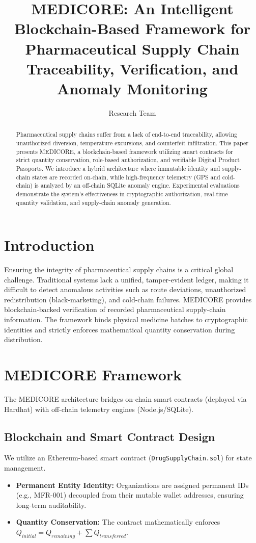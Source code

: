 \documentclass[runningheads]{llncs}
\begin{document}
\title{MEDICORE: An Intelligent Blockchain-Based Framework for Pharmaceutical Supply Chain Traceability, Verification, and Anomaly Monitoring}
\author{Research Team}

\maketitle

\begin{abstract}
Pharmaceutical supply chains suffer from a lack of end-to-end traceability, allowing unauthorized diversion, temperature excursions, and counterfeit infiltration. This paper presents MEDICORE, a blockchain-based framework utilizing smart contracts for strict quantity conservation, role-based authorization, and verifiable Digital Product Passports. We introduce a hybrid architecture where immutable identity and supply-chain states are recorded on-chain, while high-frequency telemetry (GPS and cold-chain) is analyzed by an off-chain SQLite anomaly engine. Experimental evaluations demonstrate the system's effectiveness in cryptographic authorization, real-time quantity validation, and supply-chain anomaly generation.
\end{abstract}

\section{Introduction}
Ensuring the integrity of pharmaceutical supply chains is a critical global challenge. Traditional systems lack a unified, tamper-evident ledger, making it difficult to detect anomalous activities such as route deviations, unauthorized redistribution (black-marketing), and cold-chain failures. MEDICORE provides blockchain-backed verification of recorded pharmaceutical supply-chain information. The framework binds physical medicine batches to cryptographic identities and strictly enforces mathematical quantity conservation during distribution.

\section{MEDICORE Framework}
The MEDICORE architecture bridges on-chain smart contracts (deployed via Hardhat) with off-chain telemetry engines (Node.js/SQLite). 
\subsection{Blockchain and Smart Contract Design}
We utilize an Ethereum-based smart contract (\texttt{DrugSupplyChain.sol}) for state management. 
\begin{itemize}
    \item \textbf{Permanent Entity Identity:} Organizations are assigned permanent IDs (e.g., MFR-001) decoupled from their mutable wallet addresses, ensuring long-term auditability.
    \item \textbf{Quantity Conservation:} The contract mathematically enforces $Q_{initial} = Q_{remaining} + \sum Q_{transferred}$.
\end{itemize}
\end{document}
